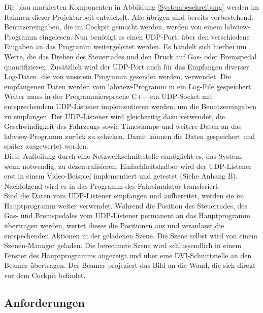 Die blau markierten Komponenten in Abbildung \ref{Systembeschreibung} werden im Rahmen dieser Projektarbeit entwickelt. Alle übrigen sind bereits vorbestehend. \\
Benutzereingaben, die im Cockpit gemacht werden, werden von einem \gls{labview}-Programm eingelesen. Nun benötigt es einen UDP-Port,  über den verschiedene Eingaben an das Programm weitergeleitet werden. Es handelt sich hierbei um Werte, die das Drehen des Steuerrades und den Druck auf Gas- oder Bremspedal quantifizieren. Zusätzlich wird der UDP-Port auch für das Empfangen diverser Log-Daten, die von unserem Programm gesendet werden, verwendet. Die empfangenen Daten werden vom \gls{labview}-Programm  in ein Log-File gespeichert.\\
Weiter muss in der Programmiersprache C++ ein UDP-Socket mit entsprechendem UDP-Listener implementieren werden, um die Benutzereingaben zu empfangen. Der UDP-Listener wird gleichzeitig dazu verwendet, die Geschwindigkeit des Fahrzeugs sowie Timestamps und weitere Daten an das \gls{labview}-Programm zurück zu schicken. Damit können die Daten gespeichert und später ausgewertet werden.\\
Diese Aufteilung durch eine Netzwerkschnittstelle ermöglicht es,  das System, wenn notwendig, zu dezentralisieren. Einfachheitshalber wird der UDP-Listener erst in einem Video-Beispiel implementiert und getestet (Siehe Anhang B). Nachfolgend wird er in das Programm des Fahrsimulator transferiert.\\
Sind die Daten vom UDP-Listener empfangen und aufbereitet, werden sie im Hauptprogramm weiter verwendet. Während die Position des Steuerrades, des Gas- und Bremspedales vom UDP-Listener permanent an das Hauptprogramm übertragen werden, wertet dieses die Positionen aus und veranlasst die entspechenden Aktionen in der geladenen Szene. 
Die Szene selbst wird von einem Szenen-Manager geladen. Die berechnete Szene wird schlussendlich in einem Fenster des Hauptprogramms angezeigt und über eine DVI-Schnittstelle an den Beamer übertragen. Der Beamer projeziert das Bild an die Wand, die sich direkt vor dem Cockpit befindet. 

\subsection{Anforderungen}

